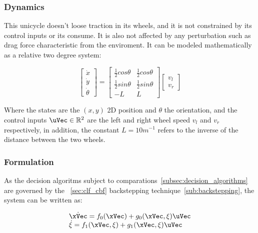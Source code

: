 \subsubsection{Dynamics}
\label{subsec:unicycle_dynamics}

This unicycle doesn't loose traction in its wheels, and it is not constrained by its control inputs or its consume. It is also not affected by any perturbation such as drag force characteristic from the enviroment. It can be modeled mathematically as a relative two degree system:

\begin{equation}
    \begin{bmatrix} \dot{x} \\ \dot{y} \\ \dot{\theta} \end{bmatrix} = \begin{bmatrix} \frac{1}{2}cos \theta & \frac{1}{2}cos \theta \\  \frac{1}{2}sin \theta & \frac{1}{2}sin \theta \\ -L & L  \end{bmatrix} \begin{bmatrix} v_l \\ v_r\end{bmatrix}
    \label{eq:unicycle_model}
\end{equation}


Where the states are the \((x,y)\) 2D position and \(\theta\) the orientation, and the control inputs \(\uVec \in \mathbb{R}^2\) are the left and right wheel speed \(v_l\) and \(v_r\) respectively, in addition, the constant \(L = 10 m^{-1}\) refers to the inverse of the distance between the two wheels. 

\subsubsection{ Formulation}
\label{subsubsec:Unicyle_CLF-CBF_Experiment_Setup}

As the decision algoritms subject to comparations~\ref{subsec:decision_algorithms} are governed by the ~\ref{sec:clf_cbf} backstepping technique~\ref{sub:backstepping}, the system can be written as:


\begin{equation}
    \begin{array}{l}
        \dot{\xVec} = f_0(\xVec) +  g_0(\xVec, \xi)\uVec \\
        \dot{\xi} = f_1(\xVec, \xi) + g_1(\xVec, \xi)\uVec
    \end{array}
    \label{eq:second_order_unicycle_model_backstepp}
\end{equation}


